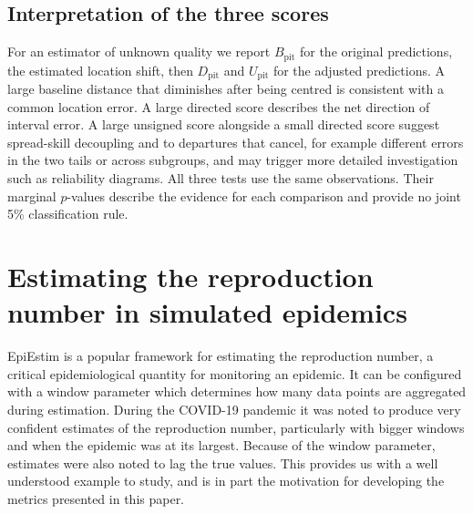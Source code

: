 \documentclass[twoside,11pt,hyphens]{article}
\newcommand{\Bpit}{B_{\mathrm{pit}}}
\newcommand{\Dpit}{D_{\mathrm{pit}}}
\newcommand{\Upit}{U_{\mathrm{pit}}}
\begin{document}



\subsection{Interpretation of the three scores}

For an estimator of unknown quality we report $\Bpit$ for the original predictions, the estimated location shift, then $\Dpit$ and $\Upit$ for the adjusted predictions. A large baseline distance that diminishes after being centred is consistent with a common location error. A large directed score describes the net direction of interval error. A large unsigned score alongside a small directed score suggest spread-skill decoupling and to departures that cancel, for example different errors in the two tails or across subgroups, and may trigger more detailed investigation such as reliability diagrams. All three tests use the same observations. Their marginal $p$-values describe the evidence for each comparison and provide no joint 5\% classification rule.

\section{Estimating the reproduction number in simulated epidemics}
\label{sec:epi}

EpiEstim \citep{cori2013,thompson2019} is a popular framework for estimating the reproduction number, a critical epidemiological quantity for monitoring an epidemic. It can be configured with a window parameter which determines how many data points are aggregated during estimation. During the COVID-19 pandemic it was noted to produce very confident estimates of the reproduction number, particularly with bigger windows and when the epidemic was at its largest. Because of the window parameter, estimates were also noted to lag the true values. This provides us with a well understood example to study, and is in part the motivation for developing the metrics presented in this paper.
\end{document}

